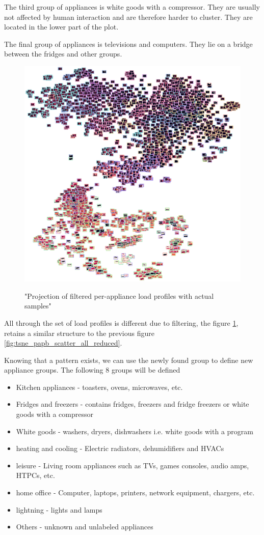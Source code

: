 The third group of appliances is white goods with a compressor.
They are usually not affected by human interaction and are therefore harder to cluster.
They are located in the lower part of the plot.

The final group of appliances is televisions and computers. They lie 
on a bridge between the fridges and other groups. 

\begin{figure}[H]
	\centering
	\caption{"Projection of filtered per-appliance load profiles with actual samples"}
	\includegraphics[width=.9\textwidth]{Figures/TSNE/TSNE_results/all/img_scatter_allall_reduced_max.png}
	\label{fig:tsne_papb_img_scatter_all_reduced}
\end{figure}

All through the set of load profiles is different due to filtering,
the figure \ref{fig:tsne_papb_img_scatter_all_reduced},
retains a similar structure to the previous figure \ref{fig:tsne_papb_scatter_all_reduced}. 

Knowing that a pattern exists, we can use the newly found group to define new appliance groups.
The following 8 groups will be defined
\begin{itemize}
    \item Kitchen appliances - toasters, ovens, microwaves, etc.
    \item Fridges and freezers  - contains fridges, freezers and fridge freezers or white goods with a compressor
    \item White goods - washers, dryers, dishwashers i.e. white goods with a program
    \item heating and cooling - Electric radiators, dehumidifiers and HVACs
    \item leisure -  Living room appliances such as TVs, games consoles, audio amps, HTPCs, etc.
    \item home office - Computer, laptops, printers, network equipment, chargers, etc.
    \item lightning - lights and lamps
    \item Others - unknown and unlabeled appliances
\end{itemize}

